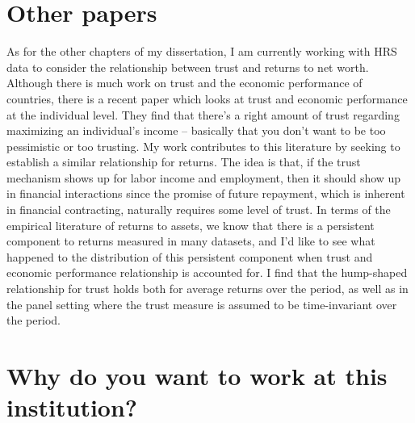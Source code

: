 \documentclass[11pt]{article}
\begin{document}
\section{\large Other papers}

As for the other chapters of my dissertation, I am currently working with HRS data to consider the relationship between trust and returns to net worth. Although there is much work on trust and the economic performance of countries, there is a recent paper which looks at trust and economic performance at the individual level. They find that there's a right amount of trust regarding maximizing an individual's income -- basically that you don't want to be too pessimistic or too trusting. My work contributes to this literature by seeking to establish a similar relationship for returns. The idea is that, if the trust mechanism shows up for labor income and employment, then it should show up in financial interactions since the promise of future repayment, which is inherent in financial contracting, naturally requires some level of trust. In terms of the empirical literature of returns to assets, we know that there is a persistent component to returns measured in many datasets, and I'd like to see what happened to the distribution of this persistent component when trust and economic performance relationship is accounted for. I find that the hump-shaped relationship for trust holds both for average returns over the period, as well as in the panel setting where the trust measure is assumed to be time-invariant over the period.



\section{\large Why do you want to work at this institution?}
\end{document}
